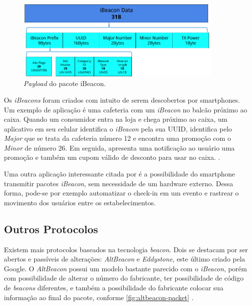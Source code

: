 \begin{figure}[htb]
	\caption{\label{fig:ibeacon-packet}\textit{Payload} do pacote iBeacon.}
	\begin{center}
		\includegraphics[width=0.9\textwidth]{img/ibeacon-packet.png}
	\end{center}
\end{figure}

Os \textit{iBeacons} foram criados com intuito de serem descobertos por smartphones. Um exemplo de aplicação é uma cafeteria com um \textit{iBeacon} no balcão próximo ao caixa. Quando um consumidor entra na loja e chega próximo ao caixa, um aplicativo em seu celular identifica o \textit{iBeacon} pela sua UUID, identifica pelo \textit{Major} que se trata da cafeteria número 12 e encontra uma promoção com o \textit{Minor} de número 26. Em seguida, apresenta uma notificação ao usuário uma promoção e também um cupom válido de desconto para usar no caixa. \cite{arm-beacons}.

Uma outra aplicação interessante citada por  é a possibilidade do smartphone transmitir pacotes \textit{iBeacon}, sem necessidade de um hardware externo. Dessa forma, pode-se por exemplo automatizar o check-in em um evento e rastrear o movimento dos usuários entre os estabelecimentos.

\subsection{Outros Protocolos}\label{sec:outros-protocolos}

Existem mais protocolos baseados na tecnologia \textit{beacon}. Dois se destacam por ser abertos e passíveis de alterações: \textit{AltBeacon} e \textit{Eddystone}, este último criado pela Google. O \textit{AltBeacon} possui um modelo bastante parecido com o \textit{iBeacon}, porém com possibilidade de alterar o número do fabricante, ter possibilidade de código de \textit{beacons} diferentes, e também a possibilidade do fabricante colocar sua informação ao final do pacote, conforme \autoref{fig:altbeacon-packet} \cite{arm-beacons}.

